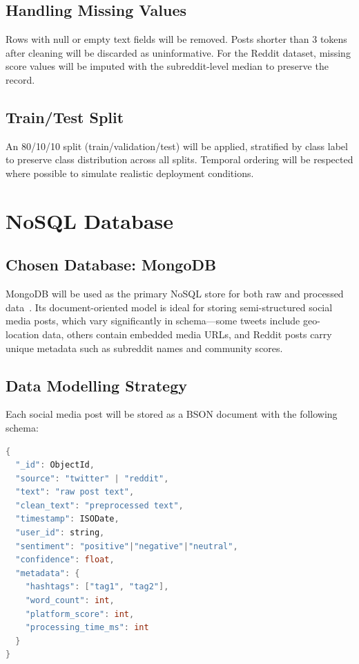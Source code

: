 \documentclass[conference]{IEEEtran}
\begin{document}
\subsection{Handling Missing Values}
Rows with null or empty text fields will be removed. Posts shorter than 3 tokens after cleaning will be discarded as uninformative. For the Reddit dataset, missing score values will be imputed with the subreddit-level median to preserve the record.

\subsection{Train/Test Split}
An 80/10/10 split (train/validation/test) will be applied, stratified by class label to preserve class distribution across all splits. Temporal ordering will be respected where possible to simulate realistic deployment conditions.

\section{NoSQL Database}

\subsection{Chosen Database: MongoDB}
MongoDB will be used as the primary NoSQL store for both raw and processed data~\cite{chodorow2013mongodb}. Its document-oriented model is ideal for storing semi-structured social media posts, which vary significantly in schema---some tweets include geo-location data, others contain embedded media URLs, and Reddit posts carry unique metadata such as subreddit names and community scores.

\subsection{Data Modelling Strategy}
Each social media post will be stored as a BSON document with the following schema:

\begin{lstlisting}[language=java, caption={MongoDB Document Schema}]
{
  "_id": ObjectId,
  "source": "twitter" | "reddit",
  "text": "raw post text",
  "clean_text": "preprocessed text",
  "timestamp": ISODate,
  "user_id": string,
  "sentiment": "positive"|"negative"|"neutral",
  "confidence": float,
  "metadata": {
    "hashtags": ["tag1", "tag2"],
    "word_count": int,
    "platform_score": int,
    "processing_time_ms": int
  }
}
\end{lstlisting}
\end{document}
